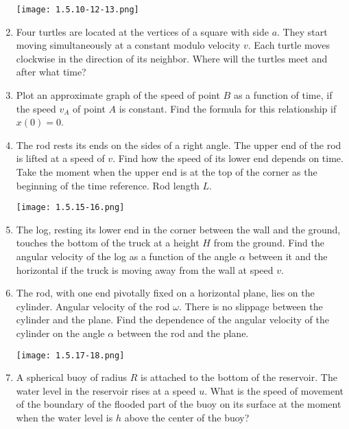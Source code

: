 \documentclass{article}
\begin{document}
\begin{enumerate}[label=1.5.\arabic*]
\begin{center}
    \texttt{[image: 1.5.10-12-13.png]}
\end{center}

\item Four turtles are located at the vertices of a square with side $a$. They start moving simultaneously at a constant modulo velocity $v$. Each turtle moves clockwise in the direction of its neighbor. Where will the turtles meet and after what time?

\item Plot an approximate graph of the speed of point $B$ as a function of time, if the speed $v_A$ of point $A$ is constant. Find the formula for this relationship if $x(0) = 0$.

\item The rod rests its ends on the sides of a right angle. The upper end of the rod is lifted at a speed of $v$. Find how the speed of its lower end depends on time. Take the moment when the upper end is at the top of the corner as the beginning of the time reference. Rod length $L$.

\begin{center}
    \texttt{[image: 1.5.15-16.png]}
\end{center}

\item The log, resting its lower end in the corner between the wall and the ground, touches the bottom of the truck at a height $H$ from the ground. Find the angular velocity of the log as a function of the angle $\alpha$ between it and the horizontal if the truck is moving away from the wall at speed $v$.

\item The rod, with one end pivotally fixed on a horizontal plane, lies on the cylinder. Angular velocity of the rod $\omega$. There is no slippage between the cylinder and the plane. Find the dependence of the angular velocity of the cylinder on the angle $\alpha$ between the rod and the plane.

\begin{center}
    \texttt{[image: 1.5.17-18.png]}
\end{center}

\item A spherical buoy of radius $R$ is attached to the bottom of the reservoir. The water level in the reservoir rises at a speed $u$. What is the speed of movement of the boundary of the flooded part of the buoy on its surface at the moment when the water level is $h$ above the center of the buoy?


\end{enumerate}
\end{document}
